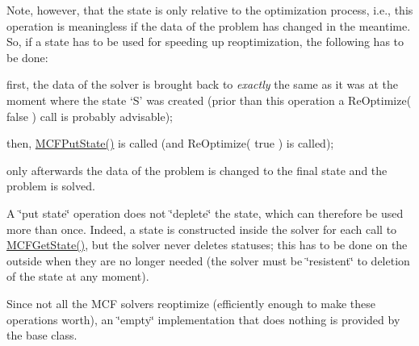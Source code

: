 Note, however, that the state is only relative to the optimization process, i.\+e., this operation is meaningless if the data of the problem has changed in the meantime. So, if a state has to be used for speeding up reoptimization, the following has to be done\+:


\begin{DoxyItemize}
\item first, the data of the solver is brought back to {\itshape exactly} the same as it was at the moment where the state `S' was created (prior than this operation a Re\+Optimize( false ) call is probably advisable);
\item then, \mbox{\hyperlink{class_m_c_f_class_ac14589cd80aed231b6fc7da247f50601}{M\+C\+F\+Put\+State()}} is called (and Re\+Optimize( true ) is called);
\item only afterwards the data of the problem is changed to the final state and the problem is solved.
\end{DoxyItemize}

A \char`\"{}put state\char`\"{} operation does not \char`\"{}deplete\char`\"{} the state, which can therefore be used more than once. Indeed, a state is constructed inside the solver for each call to \mbox{\hyperlink{class_m_c_f_class_a995a05ecaa6ece4be3afbddbb36b2c4e}{M\+C\+F\+Get\+State()}}, but the solver never deletes statuses; this has to be done on the outside when they are no longer needed (the solver must be \char`\"{}resistent\char`\"{} to deletion of the state at any moment).

Since not all the M\+CF solvers reoptimize (efficiently enough to make these operations worth), an \char`\"{}empty\char`\"{} implementation that does nothing is provided by the base class. \mbox{\label{class_m_c_f_class_acd08873d1e15db41bf42648226f8feb1}} 
